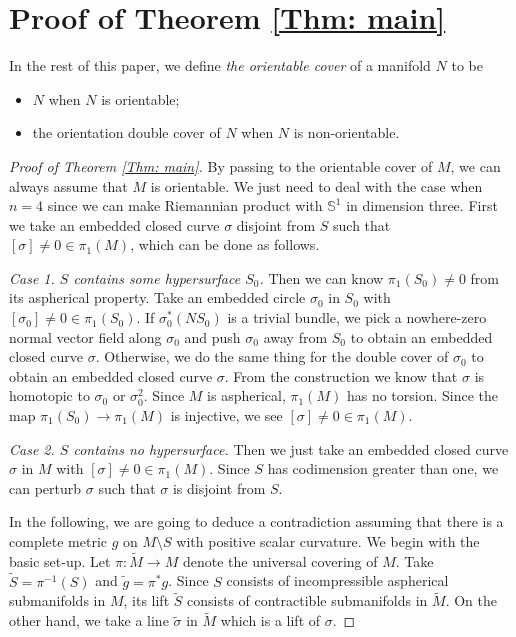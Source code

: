 \documentclass[11pt, reqno]{amsart}
\numberwithin{equation}{section}
\theoremstyle{definition}
\begin{document}
\section{Proof of Theorem \ref{Thm: main}}
In the rest of this paper, we define {\it the orientable cover} of a manifold $N$ to be
\begin{itemize}\setlength{\itemsep}{1mm}
\item $N$ when $N$ is orientable;
\item the orientation double cover of $N$ when $N$ is non-orientable.
\end{itemize}
\label{Sec: proof of main}
\begin{proof}[Proof of Theorem \ref{Thm: main}]
By passing to the orientable cover of $M$, we can always assume that $M$ is orientable. We just need to deal with the case when $n=4$ since we can make Riemannian product with $\mathbb S^1$ in dimension three. First we take an embedded closed curve $\sigma$ disjoint from $S$ such that $[\sigma]\neq 0\in \pi_1(M)$, which can be done as follows.

\medskip

{\it Case 1. $S$ contains some hypersurface $S_0$.} Then we can know $\pi_1(S_0)\neq 0$ from its aspherical property. Take an embedded circle $\sigma_0$ in $S_0$ with $[\sigma_0]\neq 0\in \pi_1(S_0)$. If $\sigma_0^*(NS_0)$ is a trivial bundle, we pick a nowhere-zero normal vector field along $\sigma_{0}$ and push $\sigma_0$ away from $S_{0}$ to obtain an embedded closed curve $\sigma$. Otherwise, we do the same thing for the double cover of $\sigma_0$ to obtain an embedded closed curve $\sigma$. From the construction we know that $\sigma$ is homotopic to $\sigma_0$ or $\sigma_0^2$. Since $M$ is aspherical, $\pi_1(M)$ has no torsion. Since the map $\pi_1(S_0)\to\pi_1(M)$ is injective, we see $[\sigma]\neq 0\in\pi_1(M)$.

\medskip

{\it Case 2. $S$ contains no hypersurface.} Then we just take an embedded closed curve $\sigma$ in $M$ with $[\sigma]\neq 0\in \pi_1(M)$. Since $S$ has codimension greater than one, we can perturb $\sigma$ such that $\sigma$ is disjoint from $S$.

\medskip

In the following, we are going to deduce a contradiction assuming that there is a complete metric $g$ on $M\setminus S$ with positive scalar curvature. We begin with the basic set-up. Let $\pi:\tilde M\to M$ denote the universal covering of $M$. Take $\tilde S=\pi^{-1}(S)$ and $\tilde g=\pi^*g$. Since $S$ consists of incompressible aspherical submanifolds in $M$, its lift $\tilde S$ consists of contractible submanifolds in $\tilde M$. On the other hand, we take a line $\tilde \sigma$ in $\tilde M$ which is a lift of $\sigma$.


\end{proof}
\end{document}
